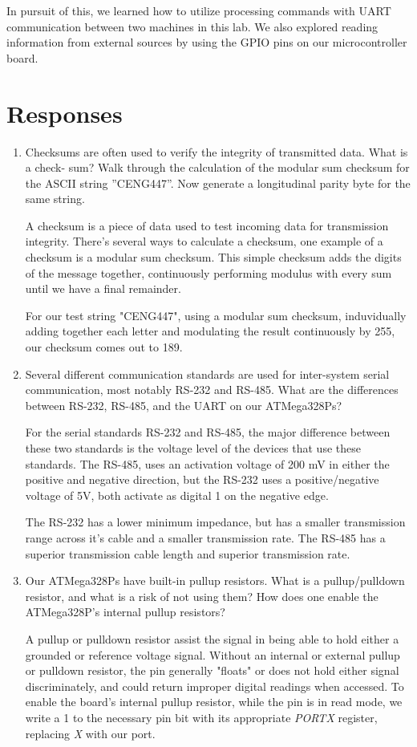 \documentclass[letterpaper,11pt]{texMemo} %
\begin{document}
    In pursuit of this, we learned how to utilize processing commands with UART communication between two 
machines in this lab. We also explored reading information from external sources by using the GPIO pins 
on our microcontroller board.


\newpage
\section*{Responses}
\begin{enumerate}
    \item Checksums are often used to verify the integrity of transmitted data. What is a check-
sum? Walk through the calculation of the modular sum checksum for the ASCII string
”CENG447”. Now generate a longitudinal parity byte for the same string.
 
    A checksum is a piece of data used to test incoming data for transmission 
integrity. There's several ways to calculate a checksum, one example of a checksum is a 
modular sum checksum. This simple checksum adds the digits of the message together, continuously
performing modulus with every sum until we have a final remainder.

    For our test string "CENG447", using a modular sum checksum, induvidually
adding together each letter and modulating the result continuously by 255, our checksum comes out
to 189.

    \item Several different communication standards are used for inter-system serial communication,
most notably RS-232 and RS-485. What are the differences between RS-232, RS-485, and the
UART on our ATMega328Ps?

    For the serial standards RS-232 and RS-485, the major difference between these two standards is
the voltage level of the devices that use these standards. The RS-485, uses an activation voltage of
200 mV in either the positive and negative direction, but the RS-232 uses a positive/negative voltage
of 5V, both activate as digital 1 on the negative edge.

    The RS-232 has a lower minimum impedance, but has a smaller transmission range across it's cable
and a smaller transmission rate. The RS-485 has a superior transmission cable length and superior
transmission rate.

    \item Our ATMega328Ps have built-in pullup resistors. What is a pullup/pulldown resistor, and
what is a risk of not using them? How does one enable the ATMega328P’s internal pullup
resistors?

    A pullup or pulldown resistor assist the signal in being able to hold either a grounded or
reference voltage signal. Without an internal or external pullup or pulldown resistor, the pin
generally "floats" or does not hold either signal discriminately, and could return improper
digital readings when accessed. To enable the board's internal pullup resistor, while the pin
is in read mode, we write a 1 to the necessary pin bit with its appropriate \textit{PORTX} 
register, replacing \textit{X} with our port.

\end{enumerate}
\end{document}
